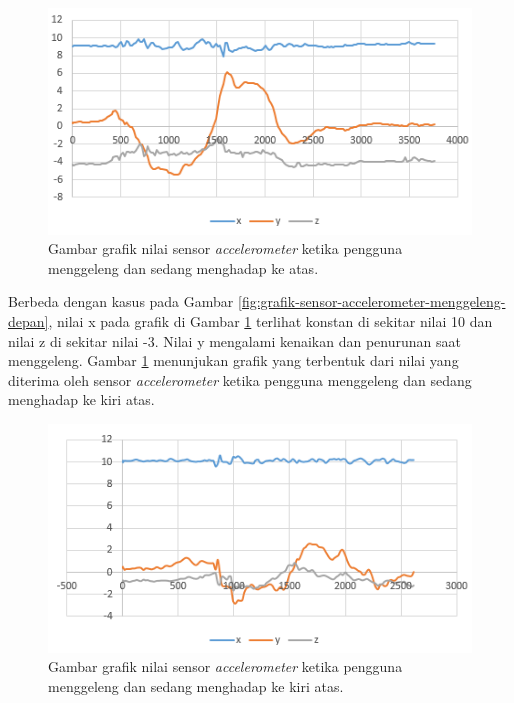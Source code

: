 \begin{figure}[htbp]
\centering
\includegraphics[scale=1]{Gambar/grafik-sensor-accelerometer-menggeleng-atas.png}
\caption{Gambar grafik nilai sensor \textit{accelerometer} ketika pengguna menggeleng dan sedang menghadap ke atas.} 
\label{fig:grafik-sensor-accelerometer-menggeleng-atas}
\end{figure}

Berbeda dengan kasus pada Gambar \ref{fig:grafik-sensor-accelerometer-menggeleng-depan}, nilai x pada grafik di Gambar \ref{fig:grafik-sensor-accelerometer-menggeleng-atas} terlihat konstan di sekitar nilai 10 dan nilai z di sekitar nilai -3. Nilai y mengalami kenaikan dan penurunan saat menggeleng. Gambar \ref{fig:grafik-sensor-accelerometer-menggeleng-atas} menunjukan grafik yang terbentuk dari nilai yang diterima oleh sensor \textit{accelerometer} ketika pengguna menggeleng dan sedang menghadap ke kiri atas.

\begin{figure}[htbp]
\centering
\includegraphics[scale=1]{Gambar/grafik-sensor-accelerometer-menggeleng-kiri-atas.png}
\caption{Gambar grafik nilai sensor \textit{accelerometer} ketika pengguna menggeleng dan sedang menghadap ke kiri atas.} 
\label{fig:grafik-sensor-accelerometer-menggeleng-kiri-atas}
\end{figure}

